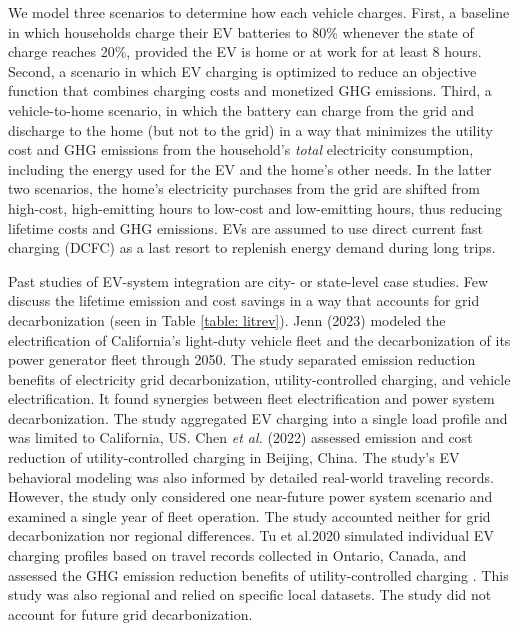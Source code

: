 \documentclass[11pt,preprint]{elsarticle}
\begin{document}
We model three scenarios to determine how each vehicle charges. First, a baseline in which households charge their EV batteries to 80\% whenever the state of charge reaches 20\%, provided the EV is home or at work for at least 8 hours. Second, a scenario in which EV charging is optimized to reduce an objective function that combines charging costs and monetized GHG emissions. Third, a vehicle-to-home scenario, in which the battery can charge from the grid and discharge to the home (but not to the grid) in a way that minimizes the utility cost and GHG emissions from the household's \textit{total} electricity consumption, including the energy used for the EV and the home's other needs. In the latter two scenarios, the home's electricity purchases from the grid are shifted from high-cost, high-emitting hours to low-cost and low-emitting hours, thus reducing lifetime costs and GHG emissions. EVs are assumed to use direct current fast charging (DCFC) as a last resort to replenish energy demand during long trips.

Past studies of EV-system integration are city- or state-level case studies. Few discuss the lifetime emission and cost savings in a way that accounts for grid decarbonization (seen in Table \ref{table: litrev}). Jenn (2023) \cite{jenn_emissions_2023} modeled the electrification of California's light-duty vehicle fleet and the decarbonization of its power generator fleet through 2050. The study separated emission reduction benefits of electricity grid decarbonization, utility-controlled charging, and vehicle electrification. It found synergies between fleet electrification and power system decarbonization. The study aggregated EV charging into a single load profile and was limited to California, US. Chen \textit{et al.} (2022) \cite{chen_emission_2022} assessed emission and cost reduction of utility-controlled charging in Beijing, China. The study's EV behavioral modeling was also informed by detailed real-world traveling records. However, the study only considered one near-future power system scenario and examined a single year of fleet operation. The study accounted neither for grid decarbonization nor regional differences. Tu et al.2020 simulated individual EV charging profiles based on travel records collected in Ontario, Canada, and assessed the GHG emission reduction benefits of utility-controlled charging \cite{tu_electric_2020}. This study was also regional and relied on specific local datasets. The study did not account for future grid decarbonization.
\end{document}
